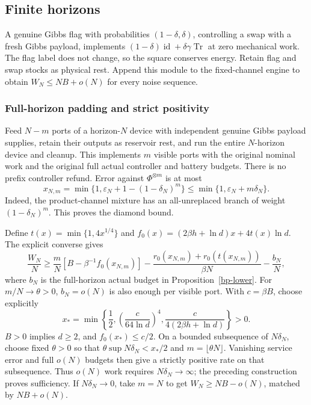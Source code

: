 \documentclass[11pt]{article}
\theoremstyle{definition}
\theoremstyle{remark}
\newcommand{\Tr}{\operatorname{Tr}}
\providecommand{\id}{\operatorname{id}}
\begin{document}
\subsection{Finite horizons}
A genuine Gibbs flag with probabilities $(1-\delta,\delta)$,
controlling a swap with a fresh Gibbs payload, implements
$(1-\delta)\id+\delta\gamma\Tr$ at zero mechanical work.
The flag label does not change, so the square conserves energy.
Retain flag and swap stocks as physical rest. Append this module
to the fixed-channel engine to obtain $W_N\le NB+o(N)$ for every
noise sequence.

\subsubsection{Full-horizon padding and strict positivity}
Feed $N-m$ ports of a horizon-$N$ device with independent genuine
Gibbs payload supplies, retain their outputs as reservoir rest, and
run the entire $N$-horizon device and cleanup.
This implements $m$ visible ports with the original nominal work
and the original full actual controller and battery budgets.
There is no prefix controller refund.
Error against $\Phi^{\otimes m}$ is at most
\[
 x_{N,m}=\min\{1,\varepsilon_N+1-(1-\delta_N)^m\}
       \le\min\{1,\varepsilon_N+m\delta_N\}.
\]
Indeed, the product-channel mixture has an all-unreplaced branch
of weight $(1-\delta_N)^m$. This proves the diamond bound.

Define $t(x)=\min\{1,4x^{1/4}\}$ and
$f_0(x)=(2\beta h+\ln d)x+4t(x)\ln d$.
The explicit converse gives
\begin{equation}\label{bp-padding}
 \frac{W_N}{N}\ge\frac mN[B-\beta^{-1}f_0(x_{N,m})]
 -\frac{r_0(x_{N,m})+r_0(t(x_{N,m}))}{\beta N}
 -\frac{b_N}{N},
\end{equation}
where $b_N$ is the full-horizon actual budget in Proposition~\ref{bp-lower}.
For $m/N\to\theta>0$, $b_N=o(N)$ is also enough per visible port.
With $c=\beta B$, choose explicitly
\[
 x_*=\min\left\{\frac12,
       \left(\frac{c}{64\ln d}\right)^4,
       \frac{c}{4(2\beta h+\ln d)}\right\}>0.
\]
$B>0$ implies $d\ge2$, and $f_0(x_*)\le c/2$.
On a bounded subsequence of $N\delta_N$, choose fixed $\theta>0$
so that $\theta\sup N\delta_N<x_*/2$ and $m=\lfloor\theta N\rfloor$.
Vanishing service error and full $o(N)$ budgets then give a strictly
positive rate on that subsequence.
Thus $o(N)$ work requires $N\delta_N\to\infty$; the preceding
construction proves sufficiency.
If $N\delta_N\to0$, take $m=N$ to get $W_N\ge NB-o(N)$,
matched by $NB+o(N)$.
\end{document}
